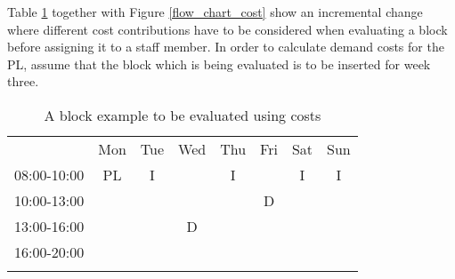Table \ref{block_to_evaluate} together with Figure \ref{flow_chart_cost} show an incremental change where different cost contributions have to be considered when evaluating a block before assigning it to a staff member. In order to calculate demand costs for the PL, assume that the block which is being evaluated is to be inserted for week three.

\begin{table}[!h]
\centering
\caption{A block example to be evaluated using costs}
\label{block_to_evaluate}
\begin{tabular}{cccccccc}
                                 & Mon                                             & Tue                    & Wed                                            & Thu                    & Fri                                            & Sat                    & Sun                    \\ \cline{2-8} 
\multicolumn{1}{c|}{08:00-10:00} & \multicolumn{1}{c|}{\cellcolor[HTML]{FCFF2F}PL} & \multicolumn{1}{c|}{I} & \multicolumn{1}{c|}{}                          & \multicolumn{1}{c|}{I} & \multicolumn{1}{c|}{}                          & \multicolumn{1}{c|}{I} & \multicolumn{1}{c|}{I} \\ \cline{2-8} 
\multicolumn{1}{c|}{10:00-13:00} & \multicolumn{1}{c|}{\cellcolor[HTML]{FCFF2F}}   & \multicolumn{1}{c|}{}  & \multicolumn{1}{c|}{}                          & \multicolumn{1}{c|}{}  & \multicolumn{1}{c|}{\cellcolor[HTML]{FCFF2F}D} &                        &                        \\ \cline{2-6}
\multicolumn{1}{c|}{13:00-16:00} & \multicolumn{1}{c|}{\cellcolor[HTML]{FCFF2F}}   & \multicolumn{1}{c|}{}  & \multicolumn{1}{c|}{\cellcolor[HTML]{FCFF2F}D} & \multicolumn{1}{c|}{}  & \multicolumn{1}{c|}{}                          &                        &                        \\ \cline{2-6}
\multicolumn{1}{c|}{16:00-20:00} & \multicolumn{1}{c|}{}                           & \multicolumn{1}{c|}{}  & \multicolumn{1}{c|}{}                          & \multicolumn{1}{c|}{}  & \multicolumn{1}{c|}{}                          &                        &                        \\ \cline{2-6}
                                 &                                                 &                        &                                                &                        &                                                &                        &                        \\

\end{tabular}
\end{table}
